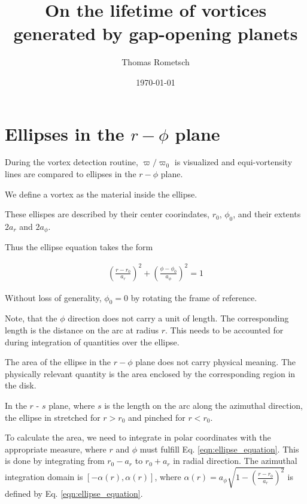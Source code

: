 \documentclass[a4paper]{scrartcl}
\begin{document}
\title{On the lifetime of vortices generated by gap-opening planets}

\author{Thomas Rometsch}

\date{\today}

\maketitle
%



\section{Ellipses in the $r-\phi$ plane}

During the vortex detection routine, $\varpi/\varpi_0$ is visualized and equi-vortensity
lines are compared to ellipses in the $r-\phi$ plane.

We define a vortex as the material inside the ellipse.

These ellispes are described by their center coorindates, $r_0$, $\phi_0$, and their extents
$2a_r$ and $2a_\phi$.

Thus the ellipse equation takes the form

\begin{align}\label{eqn:ellipse_equation}
  \left( \frac{r - r_0}{a_r} \right)^2 + \left( \frac{\phi - \phi_0}{a_\phi} \right)^2 = 1
\end{align}

Without loss of generality, $\phi_0 = 0$ by rotating the frame of reference.

Note, that the $\phi$ direction does not carry a unit of length.
The corresponding length is the distance on the arc at radius $r$.
This needs to be accounted for during integration of quantities over the ellipse.

The area of the ellipse in the $r-\phi$ plane does not carry physical meaning.
The physically relevant quantity is the area enclosed by the corresponding region in the disk.

In the $r$ - $s$ plane, where $s$ is the length on the arc along the azimuthal direction,
the ellipse in stretched for $r > r_0$ and pinched for $r < r_0$.

To calculate the area, we need to integrate in polar coordinates with the appropriate measure,
where $r$ and $\phi$ must fulfill Eq. \eqref{eqn:ellipse_equation}.
This is done by integrating from $r_0 - a_r$ to $r_0 + a_r$ in radial direction.
The azimuthal integration domain is $[-\alpha(r), \alpha(r)]$, where
$\alpha(r) = a_\phi \sqrt{1 - \left(\frac{r-r_0}{a_r}\right)^2}$ is defined by Eq. \eqref{eqn:ellipse_equation}.
\end{document}
